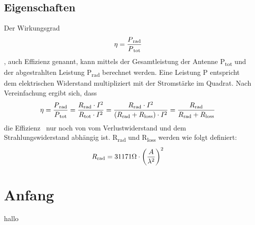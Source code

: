 \subsection{Eigenschaften\label{antennen:antennenEigenschaften}}
Der Wirkungsgrad
\begin{equation}
	\eta=\frac{P\textsubscript{rad}}{P\textsubscript{tot}}
	\label{antennen:Wirkungsgrad}
\end{equation}
, auch Effizienz genannt, kann mittels der Gesamtleistung der Antenne P\textsubscript{tot} und der abgestrahlten Leistung P\textsubscript{rad} berechnet werden. Eine Leistung P entspricht dem elektrischen Widerstand multipliziert mit der Stromstärke im Quadrat. Nach Vereinfachung ergibt sich, dass
\begin{equation}
	\eta=\frac{P\textsubscript{rad}}{P\textsubscript{tot}}=\frac{R\textsubscript{rad}\cdot{I^2}}{R\textsubscript{tot}\cdot{I^2}}=\frac{R\textsubscript{rad}\cdot{I^2}}{(R\textsubscript{rad}+R\textsubscript{loss})\cdot{I^2}}=\frac{R\textsubscript{rad}}{R\textsubscript{rad}+R\textsubscript{loss}}
	\label{antennen:Wirkungsgradkomplett}
\end{equation}
die Effizienz \texteta\ nur noch von vom Verlustwiderstand und dem Strahlungswiderstand abhängig ist. R\textsubscript{rad} und R\textsubscript{loss} werden wie folgt definiert:
\begin{equation}
	R\textsubscript{rad}=31171\Omega\cdot{\bigg(\frac{A}{\lambda^2}\bigg)^2}
	\label{antennen:Rrad}
\end{equation}
\section{Anfang\label{antennen:antennenAllgemein2}}

hallo